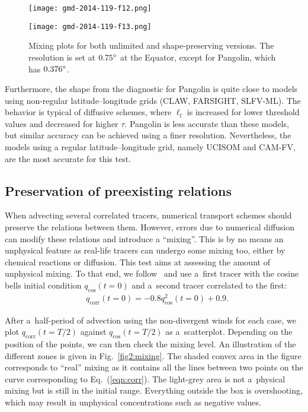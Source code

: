 \begin{figure}[t]
  \hspace*{-0.3cm}
  \begin{minipage}[t]{0.5\linewidth}
\texttt{[image: gmd-2014-119-f12.png]}
  \end{minipage}
  \begin{minipage}[t]{0.5\linewidth}
\texttt{[image: gmd-2014-119-f13.png]}
  \end{minipage}
\caption{Mixing plots for both unlimited and shape-preserving versions.
    The resolution is set at $0.75^{\circ}$ at the Equator, except for Pangolin,
  which has $0.376^{\circ}$.}
\label{fig2:mixing1}%

\end{figure}%

    Furthermore, the shape from the diagnostic for Pangolin is quite close to
    models using non-regular latitude--longitude grids (CLAW, FARSIGHT, SLFV-ML).
    The behavior is typical of diffusive schemes, where $\ell_{\mathrm{f}}$ is
    increased for lower threshold values and decreased for higher $\tau$.
    Pangolin is less accurate than these models, but similar accuracy can be
    achieved using a finer resolution. Nevertheless, the models using a regular
    latitude--longitude grid, namely UCISOM and CAM-FV, are the most accurate for
    this test.

      \subsection{Preservation of preexisting relations}

   When advecting several correlated tracers, numerical transport
   schemes should preserve the relations between them.  However,
   errors due to numerical diffusion can modify these relations and
   introduce a ``mixing''.  This is by no means an unphysical feature
   as real-life tracers can undergo some mixing too, either by
   chemical reactions or diffusion. This test aims at assessing the
   amount of unphysical mixing. To that end, we
   follow~\citet{Lauritzen2012} and use a~first tracer with the cosine
   bells initial condition $q_{\text{cos}}(t=0)$ and a~second tracer
   correlated to the first:
\begin{align}
&q_{\text{corr}}(t=0) = -0.8 q_{\text{cos}}^2(t=0) + 0.9.
  \label{eqn:corr}
  \end{align}

  After a~half-period of advection using the non-divergent winds for
  each case, we plot $q_{\text{corr}}(t=T/2)$ against
  $q_{\text{cos}}(t=T/2)$ as a~scatterplot. Depending on the position
  of the points, we can then check the mixing level. An illustration
  of the different zones is given in Fig.~\ref{fig2:mixing}.  The
  shaded convex area in the figure corresponds to ``real''
  mixing as it contains all the lines between two points on the curve
  corresponding to Eq.~(\ref{eqn:corr}). The light-grey area is not a~physical mixing
  but is still in the initial range.  Everything outside the box is
  overshooting, which may result in unphysical concentrations such as negative
  values.




